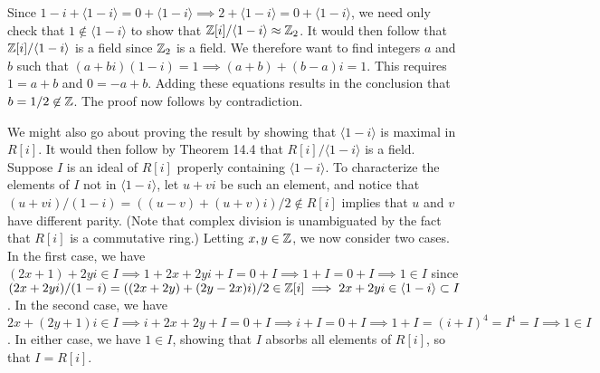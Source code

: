 \documentclass{article}
\begin{document}
Since $1-i+\langle 1-i\rangle=0+\langle 1-i\rangle\implies 2+\langle
1-i\rangle=0+\langle 1-i\rangle$, we need only check that $1\not\in\langle 1-i\rangle$
to show that $\mathbb{Z}[i]/\langle 1-i\rangle\approx\mathbb{Z}_2$.  It would then follow that
$\mathbb{Z}[i]/\langle 1-i\rangle$ is a field since $\mathbb{Z}_2$ is a field.
We therefore want to find integers $a$ and $b$ such that
$(a+bi)(1-i)=1\implies (a+b)+(b-a)i=1$.  This requires $1=a+b$ and $0=-a+b$.
Adding these equations results in the conclusion that $b=1/2\not\in\mathbb{Z}$.
The proof now follows by contradiction.

We might also go about proving the result by showing that $\langle 1-i\rangle$
is maximal in $R[i]$.  It would then follow by Theorem 14.4 that
$R[i]/\langle 1-i\rangle$ is a field.
Suppose $I$ is an ideal of $R[i]$ properly containing $\langle 1-i\rangle$.
To characterize the elements of $I$ not in $\langle 1-i\rangle$, let $u+vi$
be such an element, and notice that
$(u+vi)/(1-i)=((u-v)+(u+v)i)/2\not\in R[i]$ implies that $u$ and $v$ have
different parity.  (Note that complex division is unambiguated by the fact that
$R[i]$ is a commutative ring.)  Letting $x,y\in\mathbb{Z}$, we now consider two cases.
In the first case, we have $(2x+1)+2yi\in I\implies 1+2x+2yi+I=0+I\implies 1+I=0+I\implies 1\in I$ since
$(2x+2yi)/(1-i)=((2x+2y)+(2y-2x)i)/2\in\mathbb{Z}[i]\implies
2x+2yi\in\langle 1-i\rangle\subset I$.  In the second case, we have
$2x+(2y+1)i\in I\implies i+2x+2y+I=0+I\implies i+I=0+I\implies 1+I=(i+I)^4=I^4=I
\implies 1\in I$.  In either case, we have $1\in I$, showing that $I$ absorbs
all elements of $R[i]$, so that $I=R[i]$.
\end{document}
